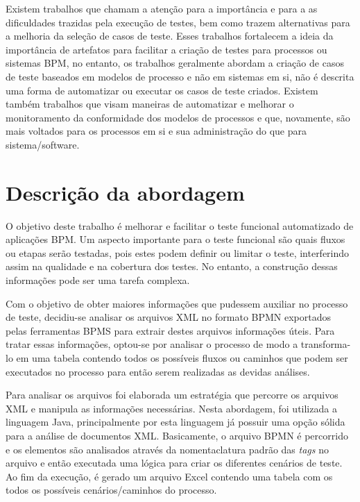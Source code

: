\documentclass[12pt]{article}
\begin{document}
Existem trabalhos que chamam a atenção para a importância e para a as dificuldades trazidas pela execução de testes, bem como trazem alternativas para a melhoria da seleção de casos de teste\cite{bohmer2015genetic}. Esses trabalhos fortalecem a ideia da importância de artefatos para facilitar a criação de testes para processos ou sistemas BPM, no entanto, os trabalhos geralmente abordam a criação de casos de teste baseados em modelos de processo e não em sistemas em si, não é descrita uma forma de automatizar ou executar os casos de teste criados. Existem também trabalhos que visam maneiras de automatizar e melhorar o monitoramento da conformidade dos modelos de processos \cite{ly2015compliance,van2012replaying} e que, novamente, são mais voltados para os processos em si e sua administração do que para sistema/software.

\section{Descrição da abordagem}
O objetivo deste trabalho é melhorar e facilitar o teste funcional automatizado de aplicações BPM. Um aspecto importante para o teste funcional são quais fluxos ou etapas serão testadas, pois estes podem definir ou limitar o teste, interferindo assim na qualidade e na cobertura dos testes. No entanto, a construção dessas informações pode ser uma tarefa complexa.

Com o objetivo de obter maiores informações que pudessem auxiliar no processo de teste, decidiu-se analisar os arquivos XML no formato BPMN exportados pelas ferramentas BPMS para extrair destes arquivos informações úteis. Para tratar essas informações, optou-se por analisar o processo de modo a transforma-lo em uma tabela contendo todos os possíveis fluxos ou caminhos que podem ser executados no processo para então serem realizadas as devidas análises. 

Para analisar os arquivos foi elaborada um estratégia que percorre os arquivos XML e manipula as informações necessárias. Nesta abordagem, foi utilizada a linguagem Java, principalmente por esta linguagem já possuir uma opção sólida para a análise de documentos XML\cite{javadom}. Basicamente, o arquivo BPMN é percorrido e os elementos são analisados através da nomentaclatura padrão das \emph{tags} no arquivo e então executada uma lógica para criar os diferentes cenários de teste. Ao fim da execução, é gerado um arquivo Excel contendo uma tabela com os todos os possíveis cenários/caminhos do processo.
\end{document}
